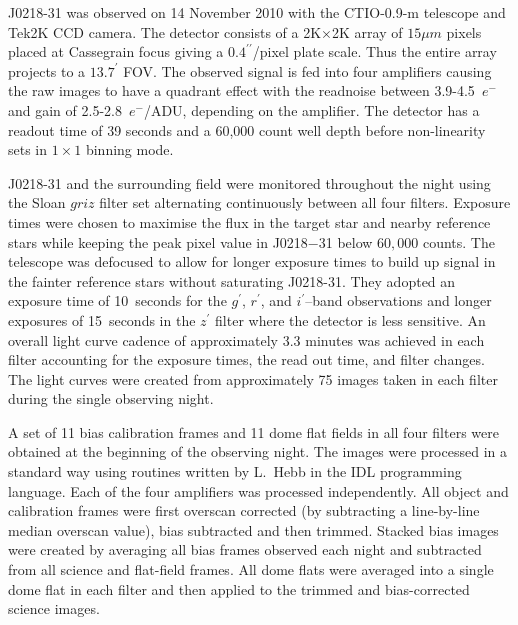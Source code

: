 J0218-31 was observed on 14 November 2010 with the CTIO-0.9-m telescope and Tek2K CCD camera. The detector consists of a 2K$\times$2K array of $15\mu m$ pixels placed at Cassegrain focus giving a $0.4^{\prime\prime}$/pixel plate scale. Thus the entire array projects to a $13.7^{\prime}$ FOV.   The observed signal is fed into four amplifiers causing the raw images to have a quadrant effect with the readnoise between 3.9-4.5~$e^{-}$ and gain of 2.5-2.8~$e^{-}$/ADU, depending on the amplifier. The detector has a readout time of 39 seconds and a 60,000 count well depth before non-linearity sets in $1\times 1$ binning mode.

J0218-31 and the surrounding field were monitored throughout the night using the Sloan $griz$ filter set alternating continuously between all four filters. Exposure times were chosen to maximise the flux in the target star and nearby reference stars while keeping the peak pixel value in J0218$-$31 below $60,000$ counts. The telescope was defocused to allow for longer exposure times to build up signal in the fainter reference stars without saturating J0218-31. They adopted an exposure time of 10~seconds for the $g^{\prime}$, $r^{\prime}$, and $i^{\prime}$--band observations and longer exposures of 15~seconds in the $z^{\prime}$ filter where the detector is less sensitive. An overall light curve cadence of approximately 3.3 minutes was achieved in each filter accounting for the exposure times,  the read out time, and filter changes. The light curves were created from approximately 75 images taken in each filter during the single observing night.

A set of 11 bias calibration frames and 11 dome flat fields in all four filters were  obtained at the beginning of the observing night. The images were processed in a standard way using routines written by L.\ Hebb in the IDL programming language.  Each of the four amplifiers was processed independently.  All object and calibration frames were first overscan corrected (by subtracting a line-by-line median overscan value), bias subtracted and then trimmed.  Stacked bias images were created by averaging all bias frames observed each night and subtracted from all science  and flat-field frames.  All dome flats were averaged into a single dome flat in each filter and then applied to the trimmed and bias-corrected science images. 

